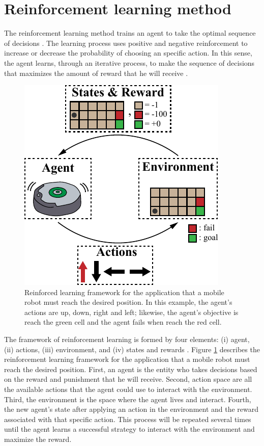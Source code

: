 \graphicspath{{images/methodology/}}
\section{Reinforcement learning method}
The reinforcement learning method trains an agent to take the optimal sequence of decisions \cite{sutton2018reinforcement}. The learning process uses positive and negative reinforcement to increase or decrease the probability of choosing an specific action. In this sense, the agent learns, through an iterative process, to make the sequence of decisions that maximizes the amount of reward that he will receive \cite{sutton2018reinforcement}.

\begin{figure}[h!]
	\centering
	\includegraphics{reinforcement_learning_diagram.pdf}
	\caption{Reinforced learning framework for the application that a mobile robot must reach the desired position. In this example, the agent's actions are up, down, right and left; likewise, the agent's objective is reach the green cell and the agent fails when reach the red cell.}
	\label{fig:RL_framework}
\end{figure}

The framework of reinforcement learning is formed by four elements: (i) agent, (ii) actions, (iii) environment, and (iv) states and rewards \cite{sutton2018reinforcement}. Figure \ref{fig:RL_framework} describes the reinforcement learning framework for the application that a mobile robot must reach the desired position. First, an agent is the entity who takes decisions based on the reward and punishment that he will receive. Second, action space are all the available actions that the agent could use to interact with the environment. Third, the environment is the space where the agent lives and interact. Fourth,  the new agent's state after applying an action in the environment and the reward associated with that specific action. This process will be repeated several times until the agent learns a successful strategy to interact with the environment and maximize the reward.

